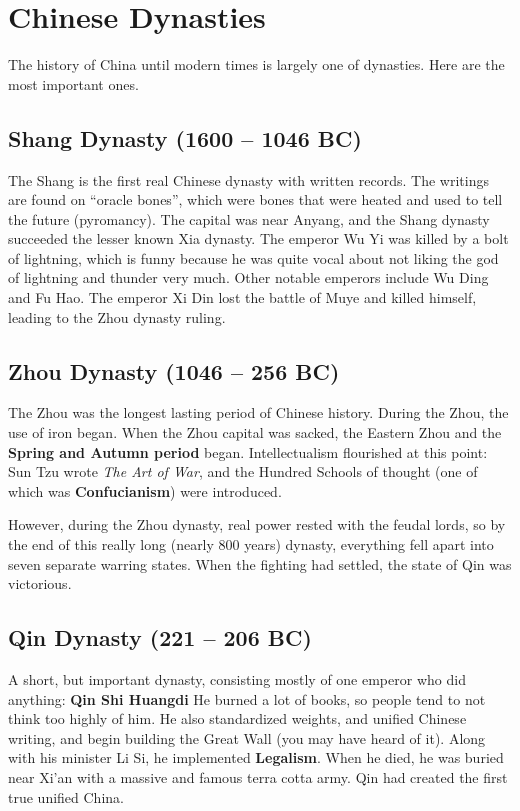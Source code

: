 \section{Chinese Dynasties}

The history of China until modern times is largely one of dynasties.
Here are the most important ones.

\subsection*{Shang Dynasty (1600 -- 1046 BC)}

The Shang is the first real Chinese dynasty with written records.
The writings are found on ``oracle bones'',
which were bones that were heated and used to tell the future (pyromancy).
The capital was near Anyang, and the Shang dynasty succeeded the lesser known Xia dynasty.
The emperor Wu Yi was killed by a bolt of lightning,
which is funny because he was quite vocal about not liking the god of lightning and thunder very much.
Other notable emperors include Wu Ding and Fu Hao.
The emperor Xi Din lost the battle of Muye and killed himself,
leading to the Zhou dynasty ruling.

\subsection*{Zhou Dynasty (1046 -- 256 BC)}

The Zhou was the longest lasting period of Chinese history.
During the Zhou, the use of iron began.
When the Zhou capital was sacked, the Eastern Zhou and the \textbf{Spring and Autumn period} began.
Intellectualism flourished at this point:
Sun Tzu wrote \textit{The Art of War},
and the Hundred Schools of thought (one of which was \textbf{Confucianism}) were introduced.

However, during the Zhou dynasty, real power rested with the feudal lords, so
by the end of this really long (nearly 800 years) dynasty,
everything fell apart into seven separate warring states.
When the fighting had settled, the state of Qin was victorious.

\subsection*{Qin Dynasty (221 -- 206 BC)}

A short, but important dynasty, consisting mostly of one emperor who did anything: \textbf{Qin Shi Huangdi}
He burned a lot of books, so people tend to not think too highly of him.
He also standardized weights, and unified Chinese writing,
and begin building the Great Wall (you may have heard of it).
Along with his minister Li Si, he implemented \textbf{Legalism}.
When he died, he was buried near Xi'an with a massive and famous terra cotta army.
Qin had created the first true unified China.

